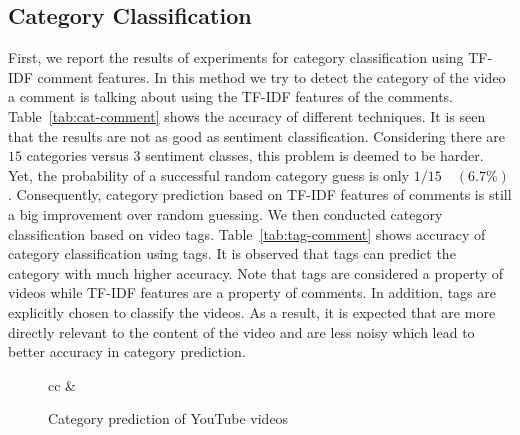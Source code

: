 \subsection{Category Classification}
\label{sec:cat-exp}

First, we report the results of experiments for category classification using TF-IDF comment features. In this method we try to detect the category of the video a comment is talking about using the TF-IDF features of the comments. Table~\ref{tab:cat-comment} shows the accuracy of different techniques. It is seen that the results are not as good as sentiment classification. Considering there are $15$ categories versus $3$ sentiment classes, this problem is deemed to be harder. Yet, the probability of a successful random category guess is only $1/15 \quad (6.7\%)$. Consequently, category prediction based on TF-IDF features of comments is still a big improvement over random guessing.
We then conducted category classification based on video tags. Table~\ref{tab:tag-comment} shows accuracy of category classification using tags. It is observed that tags can predict the category with much higher accuracy. Note that tags are considered a property of videos while TF-IDF features are a property of comments. In addition, tags are explicitly chosen to classify the videos. As a result, it is expected that are more directly relevant to the content of the video and are less noisy which lead to better accuracy in category prediction.

\begin{figure}%
\centering
\begin{tabular}{cc}
 &

\end{tabular}
\caption{Category prediction of YouTube videos}%
\label{fig:cat-prediction}%
\end{figure}
 
